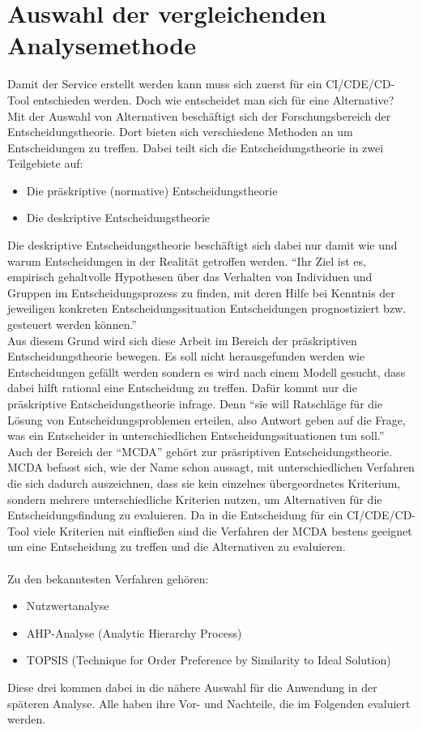 \section{Auswahl der vergleichenden Analysemethode}
Damit der Service erstellt werden kann muss sich zuerst für ein \ac{CI}/\ac{CDE}/\ac{CD}-Tool entschieden werden. Doch wie entscheidet man sich für eine Alternative? Mit der Auswahl von Alternativen beschäftigt sich der Forschungsbereich der Entscheidungstheorie. Dort bieten sich verschiedene Methoden an um Entscheidungen zu treffen. Dabei teilt sich die Entscheidungstheorie in zwei Teilgebiete auf\autocite[Vgl.][S.1]{Laux.2014}:
\begin{itemize}
	\item Die präskriptive (normative) Entscheidungstheorie
	\item Die deskriptive Entscheidungstheorie 
\end{itemize}
Die deskriptive Entscheidungstheorie beschäftigt sich dabei nur damit wie und warum Entscheidungen in der Realität getroffen werden. \enquote{Ihr Ziel ist es, empirisch gehaltvolle Hypothesen über das Verhalten von Individuen und Gruppen im Entscheidungsprozess zu finden, mit deren Hilfe bei Kenntnis der jeweiligen konkreten Entscheidungssituation Entscheidungen prognostiziert bzw. gesteuert werden können.}\autocite[S.4]{Laux.2014}\\
Aus diesem Grund wird sich diese Arbeit im Bereich der präskriptiven Entscheidungstheorie bewegen. Es soll nicht herausgefunden werden wie Entscheidungen gefällt werden sondern es wird nach einem Modell gesucht, dass dabei hilft rational eine Entscheidung zu treffen. Dafür kommt nur die präskriptive Entscheidungstheorie infrage. Denn \enquote{sie will Ratschläge für die Lösung von Entscheidungsproblemen erteilen, also Antwort geben auf die Frage, was ein Entscheider in unterschiedlichen Entscheidungssituationen tun soll.}\autocite[S.4]{Laux.2014} \\
Auch der Bereich der \enquote{\ac{MCDA}} gehört zur präsriptiven Entscheidungstheorie. \ac{MCDA} befasst sich, wie der Name schon aussagt, mit unterschiedlichen Verfahren die sich dadurch auszeichnen, dass sie kein einzelnes übergeordnetes Kriterium, sondern mehrere unterschiedliche Kriterien nutzen, um Alternativen für die Entscheidungsfindung zu evaluieren. Da in die Entscheidung für ein \ac{CI}/\ac{CDE}/\ac{CD}-Tool viele Kriterien mit einfließen sind die Verfahren der \ac{MCDA} bestens geeignet um eine Entscheidung zu treffen und die Alternativen zu evaluieren.\\ \\ Zu den bekanntesten Verfahren gehören:
\begin{itemize}
	\item Nutzwertanalyse
	\item AHP-Analyse (Analytic Hierarchy Process)
	\item TOPSIS (Technique for Order Preference by Similarity to Ideal Solution)
\end{itemize}
Diese drei kommen dabei in die nähere Auswahl für die Anwendung in der späteren Analyse. Alle haben ihre Vor- und Nachteile, die im Folgenden evaluiert werden.
